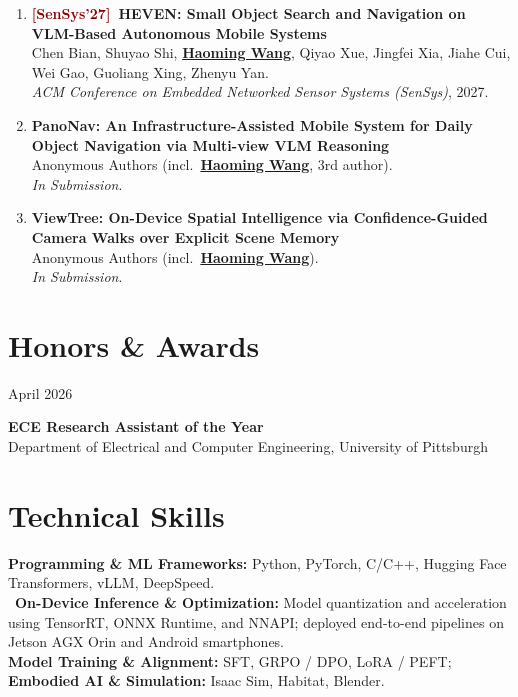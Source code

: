 \documentclass[11pt, letterpaper]{article}
\newenvironment{datedentry}[1]{%
  \par\noindent
  \begin{minipage}[t]{2.8cm}\raggedright\small #1\end{minipage}%
  \hspace{0.3cm}%
  \begin{minipage}[t]{\dimexpr\linewidth-3.1cm\relax}\raggedright
}{\end{minipage}\par\medskip}
\newenvironment{publistcont}{
  \begin{enumerate}[resume*=pubs]
}{\end{enumerate}}
\newcommand{\me}{\underline{\textbf{Haoming Wang}}}
\newcommand{\meanon}{\underline{\textbf{Haoming Wang}}}
\begin{document}
\begin{publistcont}
\item\label{pub:heven} \textbf{\textcolor{darkred}{[SenSys'27]}\ HEVEN: Small Object Search and Navigation on VLM-Based Autonomous Mobile Systems}\\
Chen Bian, Shuyao Shi, \me, Qiyao Xue, Jingfei Xia, Jiahe Cui, Wei Gao, Guoliang Xing, Zhenyu Yan.\\
\textit{ACM Conference on Embedded Networked Sensor Systems (SenSys)}, 2027.

\item\label{pub:panonav} \textbf{PanoNav: An Infrastructure-Assisted Mobile System for Daily Object Navigation via Multi-view VLM Reasoning}\\
Anonymous Authors (incl.\ \meanon, 3rd author).\\
\textit{In Submission}.

\item\label{pub:viewtree} \textbf{ViewTree: On-Device Spatial Intelligence via Confidence-Guided Camera Walks over Explicit Scene Memory}\\
Anonymous Authors (incl.\ \meanon).\\
\textit{In Submission}.
\end{publistcont}

\section{Honors \& Awards}

\begin{datedentry}{April 2026}
\textbf{ECE Research Assistant of the Year}\\
Department of Electrical and Computer Engineering, University of Pittsburgh
\end{datedentry}

\section{Technical Skills}
\textbf{Programming \& ML Frameworks:} Python, PyTorch, C/C++, Hugging Face Transformers, vLLM, DeepSpeed.\\
\
\textbf{On-Device Inference \& Optimization:} Model quantization and acceleration using TensorRT, ONNX Runtime, and NNAPI; deployed end-to-end pipelines on Jetson AGX Orin and Android smartphones.\\
\textbf{Model Training \& Alignment:} SFT, GRPO / DPO, LoRA / PEFT;\\
\textbf{Embodied AI \& Simulation:} Isaac Sim, Habitat, Blender.
\end{document}
